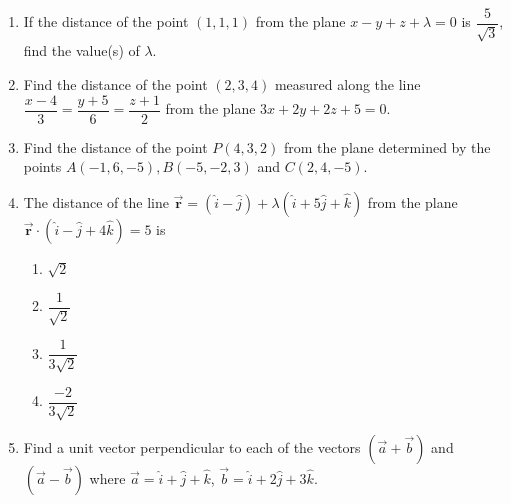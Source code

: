 %
\begin{enumerate}
\item If the distance of the point $(1,1,1)$ from the plane $x-y+z+\lambda=0$ is $\dfrac{5}{\sqrt{3}}$, find the value(s) of $\lambda$.
\vspace{4mm}
\item Find the distance of the point $(2,3,4)$ measured along the line $\dfrac{x-4}{3}=\dfrac{y+5}{6}=\dfrac{z+1}{2}$ from the plane $3x+2y+2z+5=0$.
\vspace{4mm}
\item Find the distance of the point $P(4,3,2)$ from the plane determined by the points $A(-1,6,-5),B(-5,-2,3)$ and $C(2,4,-5)$.
\vspace{4mm}
\item The distance of the line $\overrightarrow{\textbf{r}}=(\hat{i}-\hat{j})+\lambda(\hat{i}+5\hat{j}+\hat{k})$ from the plane $\overrightarrow{\textbf{r}}\cdot(\hat{i}-\hat{j}+4\hat{k})=5$ is
\vspace{2mm}
\begin{enumerate}
	\item $\sqrt{2}$
\vspace{2mm}
\item $\dfrac{1}{\sqrt{2}}$
	\vspace{2mm}
\item $\dfrac{1}{3\sqrt{2}}$
\vspace{2mm}
\item $\dfrac{-2}{3\sqrt{2}}$
\end{enumerate}
\vspace{4mm}
\item Find a unit vector perpendicular to each of the vectors $(\overrightarrow{a}+\overrightarrow{b})$ and $(\overrightarrow{a}-\overrightarrow{b})$ where $\overrightarrow{a}=\hat{i}+\hat{j}+\hat{k}$, $\overrightarrow{b}=\hat{i}+2\hat{j}+3\hat{k}$.
\end{enumerate}
%

